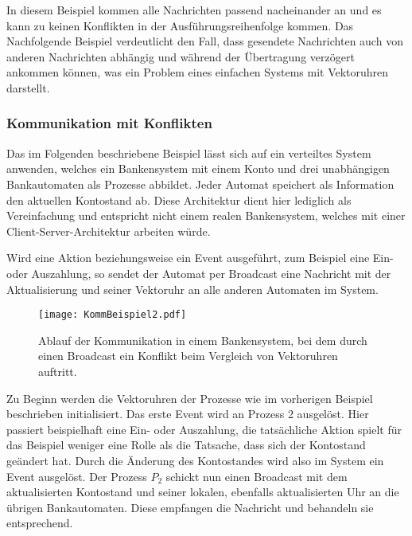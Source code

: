 In diesem Beispiel kommen alle Nachrichten passend nacheinander an und es kann zu keinen Konflikten in der Ausführungsreihenfolge kommen. Das Nachfolgende Beispiel verdeutlicht den Fall, dass gesendete Nachrichten auch von anderen Nachrichten abhängig und während der Übertragung verzögert ankommen können, was ein Problem eines einfachen Systems mit Vektoruhren darstellt.

\subsubsection{Kommunikation mit Konflikten}

Das im Folgenden beschriebene Beispiel lässt sich auf ein verteiltes System anwenden, welches ein Bankensystem mit einem Konto und drei unabhängigen Bankautomaten als Prozesse abbildet. Jeder Automat speichert als Information den aktuellen Kontostand ab. Diese Architektur dient hier lediglich als Vereinfachung und entspricht nicht einem realen Bankensystem, welches mit einer Client-Server-Architektur arbeiten würde. 

Wird eine Aktion beziehungsweise ein Event ausgeführt, zum Beispiel eine Ein- oder Auszahlung, so sendet der Automat per Broadcast eine Nachricht mit der Aktualisierung und seiner Vektoruhr an alle anderen Automaten im System.

\begin{figure}[ht]
	\centering
	\texttt{[image: KommBeispiel2.pdf]}
	\caption[Beispiel einer konfliktbehafteten Kommunikation]{Ablauf der Kommunikation in einem Bankensystem, bei dem durch einen Broadcast ein Konflikt beim Vergleich von Vektoruhren auftritt.}
	\label{figure:kommBeispiel2}
\end{figure}
\FloatBarrier

Zu Beginn werden die Vektoruhren der Prozesse wie im vorherigen Beispiel beschrieben initialisiert. Das erste Event wird an Prozess 2 ausgelöst. Hier passiert beispielhaft eine Ein- oder Auszahlung, die tatsächliche Aktion spielt für das Beispiel weniger eine Rolle als die Tatsache, dass sich der Kontostand geändert hat. Durch die Änderung des Kontostandes wird also im System ein Event ausgelöst. Der Prozess $P_2$ schickt nun einen Broadcast mit dem aktualisierten Kontostand und seiner lokalen, ebenfalls aktualisierten Uhr an die übrigen Bankautomaten. Diese empfangen die Nachricht und behandeln sie entsprechend.

